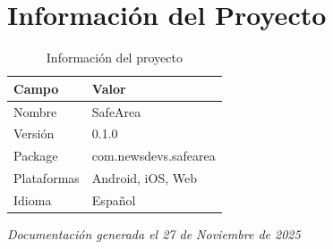 \documentclass[12pt,a4paper]{article}
\begin{document}

\section{Información del Proyecto}

\begin{table}[h]
\centering
\begin{tabular}{|l|l|}
\hline
\textbf{Campo} & \textbf{Valor} \\
\hline
Nombre & SafeArea \\
Versión & 0.1.0 \\
Package & com.newsdevs.safearea \\
Plataformas & Android, iOS, Web \\
Idioma & Español \\
\hline
\end{tabular}
\caption{Información del proyecto}
\end{table}

\vfill

\begin{center}
\textit{Documentación generada el 27 de Noviembre de 2025}
\end{center}
\end{document}

